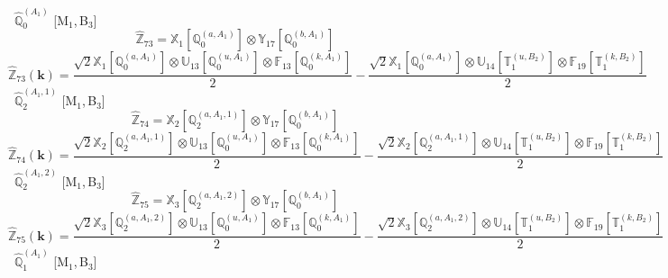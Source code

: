 \documentclass[fleqn,10pt,landscape]{article}
\begin{document}
\begin{itemize}
\vspace{4mm}
\noindent {} $\,\,\,\hat{\mathbb{Q}}_{0}^{(A_{1})}$ [M$_{1}$,\,B$_{3}$]
\begin{dmath*}
\hat{\mathbb{Z}}_{73}=\mathbb{X}_{1}[\mathbb{Q}_{0}^{(a,A_{1})}] \otimes\mathbb{Y}_{17}[\mathbb{Q}_{0}^{(b,A_{1})}]
\end{dmath*}
\begin{dmath*}
\hat{\mathbb{Z}}_{73}(\bm{k})=\frac{\sqrt{2} \mathbb{X}_{1}[\mathbb{Q}_{0}^{(a,A_{1})}] \otimes\mathbb{U}_{13}[\mathbb{Q}_{0}^{(u,A_{1})}] \otimes\mathbb{F}_{13}[\mathbb{Q}_{0}^{(k,A_{1})}]}{2} - \frac{\sqrt{2} \mathbb{X}_{1}[\mathbb{Q}_{0}^{(a,A_{1})}] \otimes\mathbb{U}_{14}[\mathbb{T}_{1}^{(u,B_{2})}] \otimes\mathbb{F}_{19}[\mathbb{T}_{1}^{(k,B_{2})}]}{2}
\end{dmath*}
\vspace{4mm}
\noindent {} $\,\,\,\hat{\mathbb{Q}}_{2}^{(A_{1},1)}$ [M$_{1}$,\,B$_{3}$]
\begin{dmath*}
\hat{\mathbb{Z}}_{74}=\mathbb{X}_{2}[\mathbb{Q}_{2}^{(a,A_{1},1)}] \otimes\mathbb{Y}_{17}[\mathbb{Q}_{0}^{(b,A_{1})}]
\end{dmath*}
\begin{dmath*}
\hat{\mathbb{Z}}_{74}(\bm{k})=\frac{\sqrt{2} \mathbb{X}_{2}[\mathbb{Q}_{2}^{(a,A_{1},1)}] \otimes\mathbb{U}_{13}[\mathbb{Q}_{0}^{(u,A_{1})}] \otimes\mathbb{F}_{13}[\mathbb{Q}_{0}^{(k,A_{1})}]}{2} - \frac{\sqrt{2} \mathbb{X}_{2}[\mathbb{Q}_{2}^{(a,A_{1},1)}] \otimes\mathbb{U}_{14}[\mathbb{T}_{1}^{(u,B_{2})}] \otimes\mathbb{F}_{19}[\mathbb{T}_{1}^{(k,B_{2})}]}{2}
\end{dmath*}
\vspace{4mm}
\noindent {} $\,\,\,\hat{\mathbb{Q}}_{2}^{(A_{1},2)}$ [M$_{1}$,\,B$_{3}$]
\begin{dmath*}
\hat{\mathbb{Z}}_{75}=\mathbb{X}_{3}[\mathbb{Q}_{2}^{(a,A_{1},2)}] \otimes\mathbb{Y}_{17}[\mathbb{Q}_{0}^{(b,A_{1})}]
\end{dmath*}
\begin{dmath*}
\hat{\mathbb{Z}}_{75}(\bm{k})=\frac{\sqrt{2} \mathbb{X}_{3}[\mathbb{Q}_{2}^{(a,A_{1},2)}] \otimes\mathbb{U}_{13}[\mathbb{Q}_{0}^{(u,A_{1})}] \otimes\mathbb{F}_{13}[\mathbb{Q}_{0}^{(k,A_{1})}]}{2} - \frac{\sqrt{2} \mathbb{X}_{3}[\mathbb{Q}_{2}^{(a,A_{1},2)}] \otimes\mathbb{U}_{14}[\mathbb{T}_{1}^{(u,B_{2})}] \otimes\mathbb{F}_{19}[\mathbb{T}_{1}^{(k,B_{2})}]}{2}
\end{dmath*}
\vspace{4mm}
\noindent {} $\,\,\,\hat{\mathbb{Q}}_{1}^{(A_{1})}$ [M$_{1}$,\,B$_{3}$]

\end{itemize}
\end{document}
